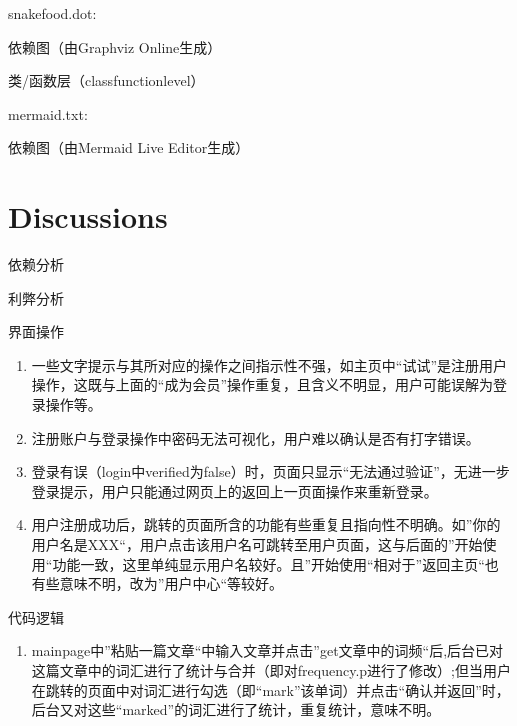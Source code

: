 \documentclass[letterpaper,10pt,english]{sphinxmanual}
\begin{document}
\sphinxAtStartPar
snakefood.dot:

\begin{sphinxVerbatim}[commandchars=\\\{\}]
\end{sphinxVerbatim}

\sphinxAtStartPar
依赖图（由Graphviz Online生成）

\sphinxAtStartPar
类/函数层（class\sphinxhyphen{}function\sphinxhyphen{}level）

\sphinxAtStartPar
mermaid.txt:

\begin{sphinxVerbatim}[commandchars=\\\{\}]
\end{sphinxVerbatim}

\sphinxAtStartPar
依赖图（由Mermaid Live Editor生成）


\chapter{Discussions}
\label{\detokenize{lab1:discussions}}
\sphinxAtStartPar
依赖分析

\sphinxAtStartPar
利弊分析

\sphinxAtStartPar
界面操作
\begin{enumerate}
%
\item {} 
\sphinxAtStartPar
一些文字提示与其所对应的操作之间指示性不强，如主页中“试试”是注册用户操作，这既与上面的“成为会员”操作重复，且含义不明显，用户可能误解为登录操作等。

\item {} 
\sphinxAtStartPar
注册账户与登录操作中密码无法可视化，用户难以确认是否有打字错误。

\item {} 
\sphinxAtStartPar
登录有误（login中verified为false）时，页面只显示“无法通过验证”，无进一步登录提示，用户只能通过网页上的返回上一页面操作来重新登录。

\item {} 
\sphinxAtStartPar
用户注册成功后，跳转的页面所含的功能有些重复且指向性不明确。如”你的用户名是XXX“，用户点击该用户名可跳转至用户页面，这与后面的”开始使用“功能一致，这里单纯显示用户名较好。且”开始使用“相对于”返回主页“也有些意味不明，改为”用户中心“等较好。

\end{enumerate}

\sphinxAtStartPar
代码逻辑
\begin{enumerate}
%
\item {} 
\sphinxAtStartPar
mainpage中”粘贴一篇文章“中输入文章并点击”get文章中的词频“后,后台已对这篇文章中的词汇进行了统计与合并（即对frequency.p进行了修改）;但当用户在跳转的页面中对词汇进行勾选（即“mark”该单词）并点击“确认并返回”时，后台又对这些“marked”的词汇进行了统计，重复统计，意味不明。

\end{enumerate}
\end{document}
